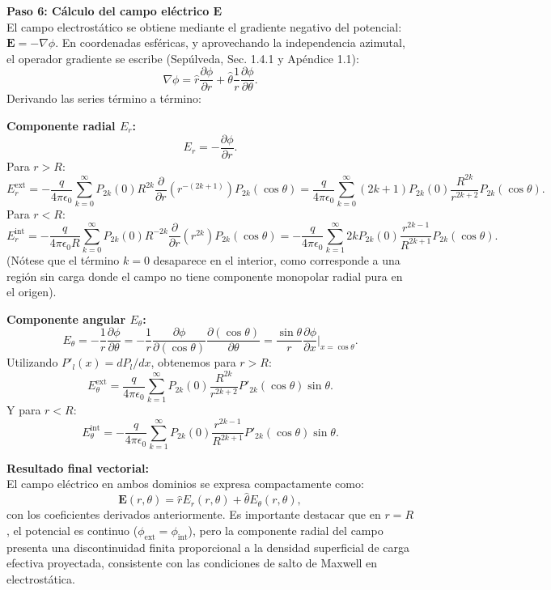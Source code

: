 \documentclass[a4paper]{article}
\begin{document}
\vspace{0.3cm}
\noindent\textbf{Paso 6: Cálculo del campo eléctrico $\mathbf{E}$}\\
El campo electrostático se obtiene mediante el gradiente negativo del potencial: $\mathbf{E} = -\nabla \phi$. En coordenadas esféricas, y aprovechando la independencia azimutal, el operador gradiente se escribe (Sepúlveda, Sec. 1.4.1 y Apéndice 1.1):
$$
\nabla \phi = \hat{r} \frac{\partial \phi}{\partial r} + \hat{\theta} \frac{1}{r} \frac{\partial \phi}{\partial \theta}.
$$
Derivando las series término a término:

\noindent\textbf{Componente radial $E_r$:}
$$
E_r = -\frac{\partial \phi}{\partial r}.
$$
Para $r > R$:
$$
E_r^{\text{ext}} = -\frac{q}{4\pi\epsilon_0} \sum_{k=0}^{\infty} P_{2k}(0) R^{2k} \frac{\partial}{\partial r}\left(r^{-(2k+1)}\right) P_{2k}(\cos\theta) = \frac{q}{4\pi\epsilon_0} \sum_{k=0}^{\infty} (2k+1) P_{2k}(0) \frac{R^{2k}}{r^{2k+2}} P_{2k}(\cos\theta).
$$
Para $r < R$:
$$
E_r^{\text{int}} = -\frac{q}{4\pi\epsilon_0 R} \sum_{k=0}^{\infty} P_{2k}(0) R^{-2k} \frac{\partial}{\partial r}\left(r^{2k}\right) P_{2k}(\cos\theta) = -\frac{q}{4\pi\epsilon_0} \sum_{k=1}^{\infty} 2k P_{2k}(0) \frac{r^{2k-1}}{R^{2k+1}} P_{2k}(\cos\theta).
$$
(Nótese que el término $k=0$ desaparece en el interior, como corresponde a una región sin carga donde el campo no tiene componente monopolar radial pura en el origen).

\noindent\textbf{Componente angular $E_\theta$:}
$$
E_\theta = -\frac{1}{r} \frac{\partial \phi}{\partial \theta} = -\frac{1}{r} \frac{\partial \phi}{\partial (\cos\theta)} \frac{\partial (\cos\theta)}{\partial \theta} = \frac{\sin\theta}{r} \frac{\partial \phi}{\partial x} \Big|_{x=\cos\theta}.
$$
Utilizando $P'_l(x) = dP_l/dx$, obtenemos para $r > R$:
$$
E_\theta^{\text{ext}} = \frac{q}{4\pi\epsilon_0} \sum_{k=1}^{\infty} P_{2k}(0) \frac{R^{2k}}{r^{2k+2}} P'_{2k}(\cos\theta) \sin\theta.
$$
Y para $r < R$:
$$
E_\theta^{\text{int}} = -\frac{q}{4\pi\epsilon_0} \sum_{k=1}^{\infty} P_{2k}(0) \frac{r^{2k-1}}{R^{2k+1}} P'_{2k}(\cos\theta) \sin\theta.
$$

\vspace{0.3cm}
\noindent\textbf{Resultado final vectorial:}\\
El campo eléctrico en ambos dominios se expresa compactamente como:
$$
\mathbf{E}(r, \theta) = \hat{r} E_r(r, \theta) + \hat{\theta} E_\theta(r, \theta),
$$
con los coeficientes derivados anteriormente. Es importante destacar que en $r=R$, el potencial es continuo ($\phi_{\text{ext}} = \phi_{\text{int}}$), pero la componente radial del campo presenta una discontinuidad finita proporcional a la densidad superficial de carga efectiva proyectada, consistente con las condiciones de salto de Maxwell en electrostática.
\end{document}
